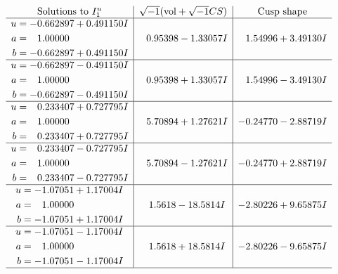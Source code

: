 \documentclass[1p]{elsarticle_modified}
\theoremstyle{definition}
\newcommand{\I}{\sqrt{-1}}
\begin{document}
$$\begin{array}{c|c|c}  
\text{Solutions to }I^u_{1}& \I (\text{vol} + \sqrt{-1}CS) & \text{Cusp shape}\\
 \hline 
\begin{aligned}
u &= -0.662897 + 0.491150 I \\
a &= \phantom{-}1.00000\phantom{ +0.000000I} \\
b &= -0.662897 + 0.491150 I\end{aligned}
 & \phantom{-}0.95398 - 1.33057 I & \phantom{-}1.54996 + 3.49130 I \\ \hline\begin{aligned}
u &= -0.662897 - 0.491150 I \\
a &= \phantom{-}1.00000\phantom{ +0.000000I} \\
b &= -0.662897 - 0.491150 I\end{aligned}
 & \phantom{-}0.95398 + 1.33057 I & \phantom{-}1.54996 - 3.49130 I \\ \hline\begin{aligned}
u &= \phantom{-}0.233407 + 0.727795 I \\
a &= \phantom{-}1.00000\phantom{ +0.000000I} \\
b &= \phantom{-}0.233407 + 0.727795 I\end{aligned}
 & \phantom{-}5.70894 + 1.27621 I & -0.24770 - 2.88719 I \\ \hline\begin{aligned}
u &= \phantom{-}0.233407 - 0.727795 I \\
a &= \phantom{-}1.00000\phantom{ +0.000000I} \\
b &= \phantom{-}0.233407 - 0.727795 I\end{aligned}
 & \phantom{-}5.70894 - 1.27621 I & -0.24770 + 2.88719 I \\ \hline\begin{aligned}
u &= -1.07051 + 1.17004 I \\
a &= \phantom{-}1.00000\phantom{ +0.000000I} \\
b &= -1.07051 + 1.17004 I\end{aligned}
 & \phantom{-}1.5618 - 18.5814 I & -2.80226 + 9.65875 I \\ \hline\begin{aligned}
u &= -1.07051 - 1.17004 I \\
a &= \phantom{-}1.00000\phantom{ +0.000000I} \\
b &= -1.07051 - 1.17004 I\end{aligned}
 & \phantom{-}1.5618 + 18.5814 I & -2.80226 - 9.65875 I\\
 \hline 
 \end{array}$$\newpage\newpage\renewcommand{\arraystretch}{1}
\end{document}

